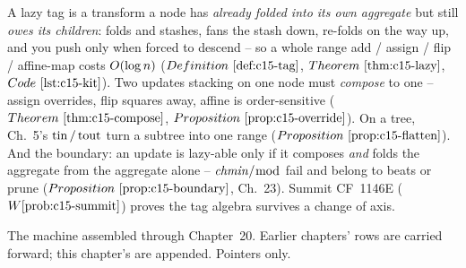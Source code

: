 \begin{recallbox}
A lazy tag is a transform a node has \emph{already folded into its own aggregate} but
still \emph{owes its children}:  folds and stashes,  fans the stash
down,  re-folds on the way up, and you push only when forced to descend -- so a
whole range add / assign / flip / affine-map costs \(O(\log n)\)
(\(\defref{c15-tag}\), \(\thmref{c15-lazy}\), \(\coderef{c15-kit}\)). Two updates stacking on
one node must \emph{compose} to one -- assign overrides, flip squares away, affine is
order-sensitive (\(\thmref{c15-compose}\), \(\propref{c15-override}\)). On a tree, Ch.~5's
\(\operatorname{tin}/\operatorname{tout}\) turn a subtree into one range (\(\propref{c15-flatten}\)). And the boundary:
an update is lazy-able only if it composes \emph{and} folds the aggregate from the aggregate
alone -- \(\mathit{chmin}/\bmod\) fail and belong to beats or prune
(\(\propref{c15-boundary}\), Ch.~23). Summit CF~1146E (\(\probref{c15-summit}\)) proves the
tag algebra survives a change of axis.
\end{recallbox}


The machine assembled through Chapter~20. Earlier chapters' rows are carried forward;
this chapter's are appended. Pointers only.

